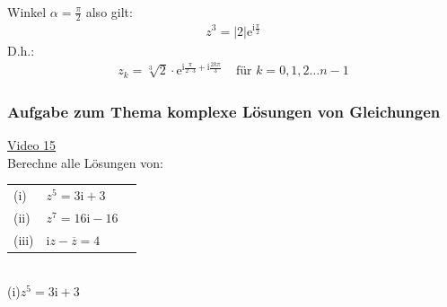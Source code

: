 \begin{center}
\begin{tikzpicture}[scale=2.5]
	\end{tikzpicture}\\
\end{center}
Winkel $ \alpha=\frac{\pi}{2} $
also gilt:
\begin{align*}
z^3=|2|\mathrm{e}^{\mathrm{i}\frac{\pi}{2}}
\end{align*}
D.h.:\\
\begin{align*}
z_k=\sqrt[3]{2}\cdot \mathrm{e}^{\mathrm{i} \frac{\pi}{2\cdot 3}+\mathrm{i}\frac{2k\pi}{3}}\;\;\;\;\text{für } k=0,1,2 \ldots n-1
\end{align*}
\subsubsection{Aufgabe zum Thema komplexe Lösungen von Gleichungen}
\href{https://youtu.be/UOdKG8lbwiQ}{Video 15}\\
Berechne alle Lösungen von:\\
\begin{tabular}[t]{lll}%
	(i) & $z^5=3\mathrm{i}+3  $  \\
	(ii) & $z^7=16\mathrm{i}-16  $ \\
	(iii)&$ \mathrm{i}z-\overline{z} =4$	
\end{tabular} \vspace*{6mm}\\
(i)\;\;$ z^5=3\mathrm{i}+3 $\\
